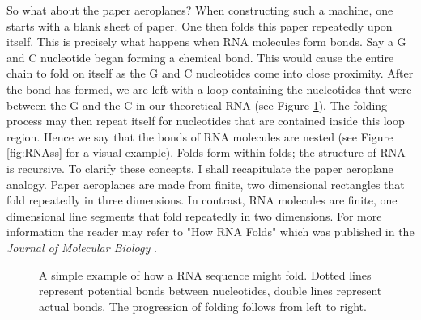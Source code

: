 \documentclass[12pt, a4paper]{article}
\begin{document}
So what about the paper aeroplanes? When constructing such a machine, one starts with a blank sheet of paper. One then folds this paper repeatedly upon itself. This is precisely what happens when RNA molecules form bonds. Say a G and C nucleotide began forming a chemical bond. This would cause the entire chain to fold on itself as the G and C nucleotides come into close proximity. After the bond has formed, we are left with a loop containing the nucleotides that were between the G and the C in our theoretical RNA (see Figure \ref{fig:RNAssBasic}). The folding process may then repeat itself for nucleotides that are contained inside this loop region. Hence we say that the bonds of RNA molecules are nested (see Figure \ref{fig:RNAss} for a visual example). Folds form within folds; the structure of RNA is recursive. To clarify these concepts, I shall recapitulate the paper aeroplane analogy. Paper aeroplanes are made from finite, two dimensional rectangles that fold repeatedly in three dimensions. In contrast, RNA molecules are finite, one dimensional line segments that fold repeatedly in two dimensions. For more information the reader may refer to "How RNA Folds" which was published in the \emph{Journal of Molecular Biology} \cite{tinoco1999rna}.

\begin{figure}
\begin{center}
\end{center}
\caption{A simple example of how a RNA sequence might fold. Dotted lines represent potential bonds between nucleotides, double lines represent actual bonds. The progression of folding follows from left to right.}
\label{fig:RNAssBasic}
\end{figure}
\end{document}
